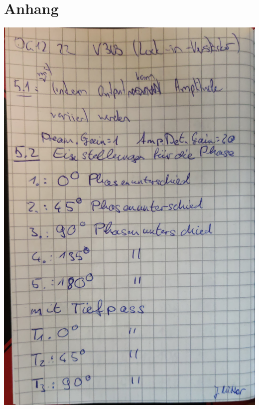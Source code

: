 \section*{Anhang}

\begin{minipage}[t]{0.4\textwidth}
    \includegraphics[width=\textwidth, page=1]{v303_messdaten.pdf}
\end{minipage}
